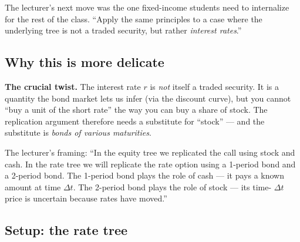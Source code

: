 The lecturer's next move was the one fixed-income students need to
internalize for the rest of the class. ``Apply the same principles
to a case where the underlying tree is not a traded security, but
rather \emph{interest rates}.''

\subsection{Why this is more delicate}\label{L8-sec:moredelicate}

\begin{keyblock}
\textbf{The crucial twist.} The interest rate $r$ is \emph{not}
itself a traded security. It is a quantity the bond market lets us
infer (via the discount curve), but you cannot ``buy a unit of the
short rate'' the way you can buy a share of stock. The replication
argument therefore needs a substitute for ``stock'' --- and the
substitute is \emph{bonds of various maturities}.
\end{keyblock}

The lecturer's framing: ``In the equity tree we replicated the call
using stock and cash. In the rate tree we will replicate the rate
option using a 1-period bond and a 2-period bond. The 1-period
bond plays the role of cash --- it pays a known amount at time
$\Delta t$. The 2-period bond plays the role of stock --- its time-
$\Delta t$ price is uncertain because rates have moved.''

\subsection{Setup: the rate tree}\label{L8-sec:ratetree}

